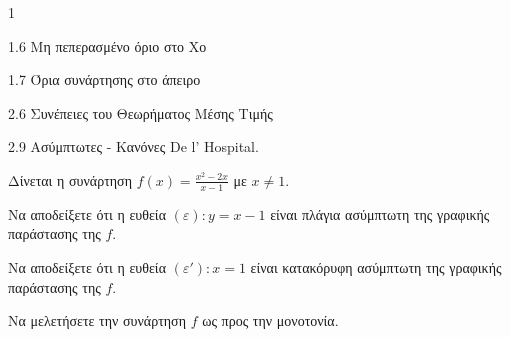 \begin{ylh}{1}
    \item 1.6 Μη πεπερασμένο όριο στο Χο
    \item 1.7 Όρια συνάρτησης στο άπειρο
    \item 2.6 Συνέπειες του Θεωρήματος Μέσης Τιμής
    \item 2.9 Ασύμπτωτες - Κανόνες De l’ Hospital.
\end{ylh}
Δίνεται η συνάρτηση $f(x) = \frac{x^2 - 2x}{x-1}$ με $x \neq 1$.
\begin{alist}
\item Να αποδείξετε ότι η ευθεία $(\varepsilon): y = x-1$ είναι πλάγια ασύμπτωτη της γραφικής παράστασης της $f$. 
\item Να αποδείξετε ότι η ευθεία $(\varepsilon'): x = 1$ είναι κατακόρυφη ασύμπτωτη της γραφικής παράστασης της $f$. 
\item Να μελετήσετε την συνάρτηση $f$ ως προς την μονοτονία. 
\end{alist}